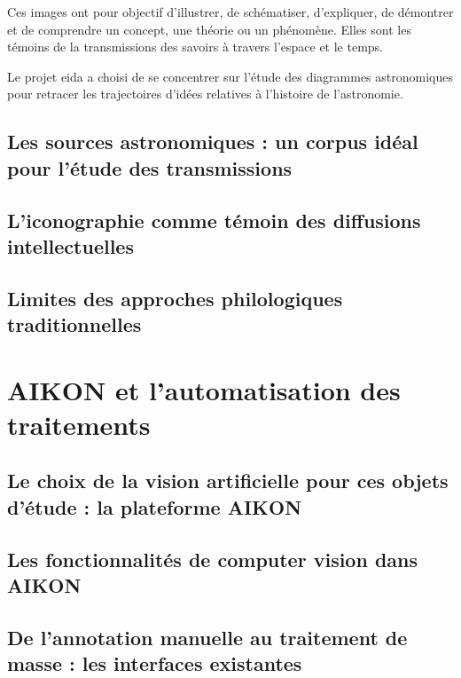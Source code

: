\documentclass[a4paper,12pt,twoside]{book}
\newcommand{\clearemptydoublepage}{\newpage{\pagestyle{empty}\cleardoublepage}}
\begin{document}
	Ces images ont pour objectif d'illustrer, de schématiser, d'expliquer, de démontrer et de comprendre un concept, une théorie ou un phénomène. Elles sont les témoins de la transmissions des savoirs à travers l'espace et le temps.
	
	Le projet \gls{eida} a choisi de se concentrer sur l'étude des diagrammes astronomiques pour retracer les trajectoires d'idées relatives à l'histoire de l'astronomie. 
	
	\section[Un corpus idéal pour l'étude des transmissions]{Les sources astronomiques : un corpus idéal pour l'étude des transmissions}
	

	\section[L'iconographie témoin des diffusions intellectuelles]{L'iconographie comme témoin des diffusions intellectuelles}

	

	\section{Limites des approches philologiques traditionnelles}
	
	\clearemptydoublepage

	\chapter{AIKON et l'automatisation des traitements}
	\section[La plateforme AIKON]{Le choix de la vision artificielle pour ces objets d'étude : la plateforme AIKON}
	
	 

	\section{Les fonctionnalités de computer vision dans AIKON}
	
	
	\section[Les interfaces existantes]{De l'annotation manuelle au traitement de masse : les interfaces existantes}
	
	
\end{document}
